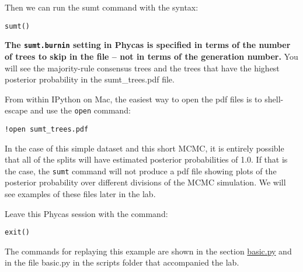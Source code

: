 \documentclass{article}
\newcommand{\cmd}[1]{\texttt{#1}\xspace}
\newcommand{\phycas}{Phycas\xspace}
\newcommand{\localfile}[1]{\textsf{#1}\xspace}
\begin{document}
Then we can run the sumt command with the syntax:
\begin{verbatim}
sumt()
\end{verbatim}
\textbf{The \cmd{sumt.burnin} setting in \phycas is specified in terms of the number of trees to skip in the file -- not in terms of the generation number.}
You will see the majority-rule consensus trees and the trees that have the 
highest posterior probability in the \localfile{sumt\_trees.pdf} file.

From within IPython on Mac, the easiest way to open the pdf files is to shell-escape and use the \cmd{open} command:
\begin{verbatim}
!open sumt_trees.pdf
\end{verbatim}


In the case of this simple dataset and this short MCMC, it is entirely possible that all of the 
splits will have estimated posterior probabilities of 1.0.
If that is the case, the \cmd{sumt} command will not produce a pdf file showing 
plots of the posterior probability over different divisions of the MCMC
simulation.
We will see examples of these files later in the lab.

Leave this \phycas session with the command:
\begin{verbatim}
exit()
\end{verbatim}
The commands for replaying this example are shown in the section \hyperref[basicpy]{basic.py} and in the file \localfile{basic.py} in the scripts folder that accompanied the lab.


\end{document}
